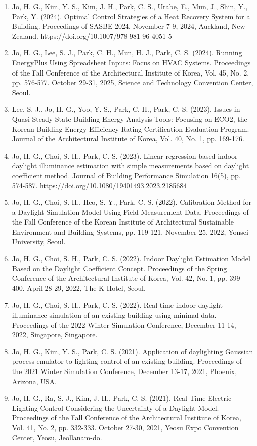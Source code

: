 \documentclass[10pt,a4paper]{article}
\begin{document}
\begin{enumerate}[leftmargin=*]
\item Jo, H. G., Kim, Y. S., Kim, J. H., Park, C. S., Urabe, E., Mun, J., Shin, Y., Park, Y. (2024). Optimal Control Strategies of a Heat Recovery System for a Building. Proceedings of SASBE 2024, November 7-9, 2024, Auckland, New Zealand. https://doi.org/10.1007/978-981-96-4051-5
\item Jo, H. G., Lee, S. J., Park, C. H., Mun, H. J., Park, C. S. (2024). Running EnergyPlus Using Spreadsheet Inputs: Focus on HVAC Systems. Proceedings of the Fall Conference of the Architectural Institute of Korea, Vol. 45, No. 2, pp. 576-577. October 29-31, 2025, Science and Technology Convention Center, Seoul.
\item Lee, S. J., Jo, H. G., Yoo, Y. S., Park, C. H., Park, C. S. (2023). Issues in Quasi-Steady-State Building Energy Analysis Tools: Focusing on ECO2, the Korean Building Energy Efficiency Rating Certification Evaluation Program. Journal of the Architectural Institute of Korea, Vol. 40, No. 1, pp. 169-176.
\item Jo, H. G., Choi, S. H., Park, C. S. (2023). Linear regression based indoor daylight illuminance estimation with simple measurements based on daylight coefficient method. Journal of Building Performance Simulation 16(5), pp. 574-587. https://doi.org/10.1080/19401493.2023.2185684
\item Jo, H. G., Choi, S. H., Heo, S. Y., Park, C. S. (2022). Calibration Method for a Daylight Simulation Model Using Field Measurement Data. Proceedings of the Fall Conference of the Korean Institute of Architectural Sustainable Environment and Building Systems, pp. 119-121. November 25, 2022, Yonsei University, Seoul.
\item Jo, H. G., Choi, S. H., Park, C. S. (2022). Indoor Daylight Estimation Model Based on the Daylight Coefficient Concept. Proceedings of the Spring Conference of the Architectural Institute of Korea, Vol. 42, No. 1, pp. 399-400. April 28-29, 2022, The-K Hotel, Seoul.
\item Jo, H. G., Choi, S. H., Park, C. S. (2022). Real-time indoor daylight illuminance simulation of an existing building using minimal data. Proceedings of the 2022 Winter Simulation Conference, December 11-14, 2022, Singapore, Singapore.
\item Jo, H. G., Kim, Y. S., Park, C. S. (2021). Application of daylighting Gaussian process emulator to lighting control of an existing building. Proceedings of the 2021 Winter Simulation Conference, December 13-17, 2021, Phoenix, Arizona, USA.
\item Jo, H. G., Ra, S. J., Kim, J. H., Park, C. S. (2021). Real-Time Electric Lighting Control Considering the Uncertainty of a Daylight Model. Proceedings of the Fall Conference of the Architectural Institute of Korea, Vol. 41, No. 2, pp. 332-333. October 27-30, 2021, Yeosu Expo Convention Center, Yeosu, Jeollanam-do.

\end{enumerate}
\end{document}

